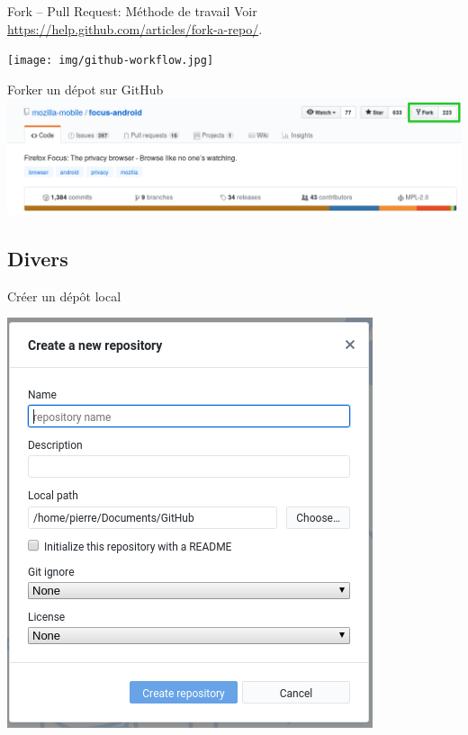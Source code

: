 \documentclass{beamer}
\begin{document}
\begin{frame}{Fork -- Pull Request: Méthode de travail}
    Voir \url{https://help.github.com/articles/fork-a-repo/}.
    \begin{center}
        \texttt{[image: img/github-workflow.jpg]}
    \end{center}
\end{frame}

\begin{frame}{Forker un dépot sur GitHub}
    \includegraphics[scale=0.30]{img/github_desktop/fork.png}
\end{frame}

\subsection{Divers}


\begin{frame}{Créer un dépôt local}
    \begin{center}
    	\includegraphics[scale=0.45]{img/new_repo.png}
    \end{center}
\end{frame}
\end{document}
